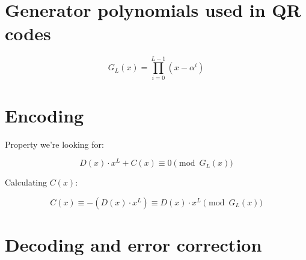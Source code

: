 \documentclass[a4paper]{article}
\begin{document}

\section{Generator polynomials used in QR codes}

\begin{displaymath}
G_L(x) = \prod_{i=0}^{L-1}(x-\alpha^i)
\end{displaymath}

\section{Encoding}

Property we're looking for:

\begin{displaymath}
D(x) \cdot x^L + C(x) \equiv 0 \pmod{G_L(x)}
\end{displaymath}

Calculating $C(x)$:

\begin{displaymath}
C(x) \equiv -(D(x) \cdot x^L) \equiv D(x) \cdot x^L \pmod{G_L(x)}
\end{displaymath}

\section{Decoding and error correction}
\end{document}
